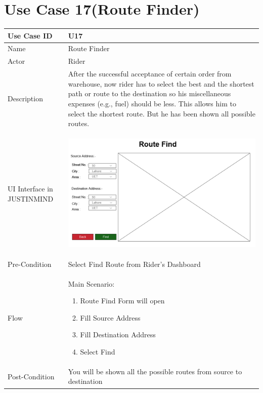 \documentclass[12pt,a4paper]{report}
\begin{document}
\section{Use Case 17(Route Finder)}

\begin{tabular}{ | m{3cm} | m{12cm}| } \hline

Use Case ID &  U17 \\\hline

Name  	    & Route Finder  \\ \hline

Actor     	& Rider \\ \hline

Description & After the successful acceptance of certain order from warehouse, now rider has to select the best and the shortest path or route to the destination so his miscellaneous expenses (e.g., fuel) should be less. This allows him to select the shortest route. But he has been shown all possible routes.   \\ \hline

UI Interface in JUSTINMIND & \begin{center} \includegraphics[scale=0.3]{./UIs for Latex Reports/UI-024 Route Finder@1x.png}\end{center}  \\ \hline

Pre-Condition &  Select Find Route from Rider’s Dashboard \\ \hline

Flow & Main Scenario:

\begin{enumerate}
\item   Route Find Form will open
\item   Fill Source Address
\item   Fill Destination Address
\item   Select Find


\end{enumerate}
\\ \hline
Post-Condition &  You will be shown all the possible routes from source to destination   \\ \hline

\end{tabular}
\end{document}
